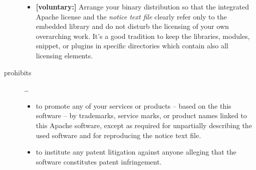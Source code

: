 \begin{description}
\begin{itemize}
 \item \textbf{[voluntary:]} Arrange your binary distribution so that the
  integrated Apache license and the \emph{notice text file} clearly refer only
  to the embedded library and do not disturb the licensing of your own
  overarching work. It's a good tradition to keep the libraries, modules,
  snippet, or plugins in specific directories which contain also all licensing
  elements.
  
\end{itemize}

\item[prohibits] \ldots
\begin{itemize}
  \item to promote any of your services or products – based on the this software
  – by trademarks, service marks, or product names linked to this Apache
  software, except as required for unpartially describing the used software and
  for reproducing the notice text file.
  \item to institute any patent litigation against anyone alleging that the
  software constitutes patent infringement.
\end{itemize}

\end{description}

